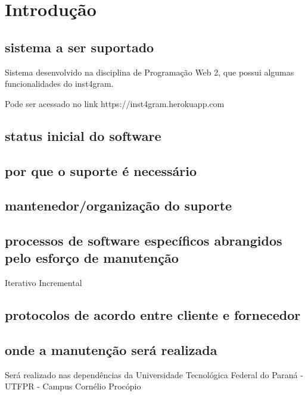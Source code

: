 \chapter{Introdução} 

\section{sistema a ser suportado}

Sistema desenvolvido na disciplina de Programação Web 2, 
que possui algumas funcionalidades do inst4gram.

Pode ser acessado no link https://inst4gram.herokuapp.com

\section{status inicial do software} 

\section{por que o suporte é necessário} 

\section{mantenedor/organização do suporte} 

\section{processos de software específicos abrangidos pelo esforço de manutenção} 

Iterativo Incremental

\section{protocolos de acordo entre cliente e fornecedor}

\section{onde a manutenção será realizada}
Será realizado nas dependências da Universidade Tecnológica Federal do Paraná - UTFPR - Campus Cornélio Procópio

